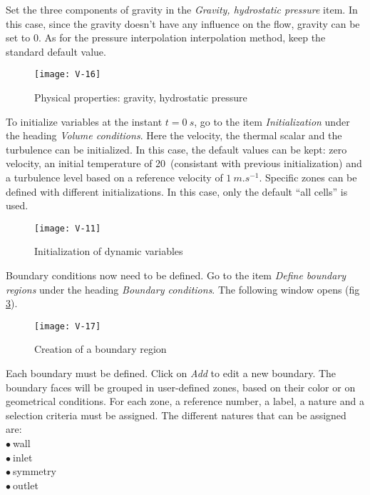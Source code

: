 \clearpage
Set the three components of gravity in the
{\itshape Gravity, hydrostatic pressure} item.
In this case, since the gravity doesn't have
any influence on the flow, gravity can be set to 0.
As for the pressure interpolation interpolation method, keep the standard
default value.

\begin{figure}[ht]
\begin{center}
\texttt{[image: V-16]}
\caption{Physical properties: gravity, hydrostatic pressure}
\label{fig19_e1}
\end{center}
\end{figure}

\clearpage
To initialize variables at the instant $t=0\ s$, go to the item {\itshape Initialization} under the heading {\itshape Volume conditions}.
Here the velocity, the thermal scalar and the turbulence can be initialized. In
this case, the default values can be kept: zero velocity, an initial temperature
of 20\degresC\ (consistant with previous initialization) and a turbulence level based on a reference velocity of $1\
m.s^{-1}$. Specific zones can be defined with different initializations. In this
case, only the default ``all cells'' is used.

\begin{figure}[ht]
\begin{center}
\texttt{[image: V-11]}
\caption{Initialization of dynamic variables}
\label{fig14_e1}
\end{center}
\end{figure}



\clearpage
Boundary conditions now need to be defined. Go to the item {\itshape Define
boundary regions} under the heading {\itshape Boundary conditions}.
The following window opens (fig \ref{fig20_e1}).

\begin{figure}[ht]
\begin{center}
\texttt{[image: V-17]}
\caption{Creation of a boundary region}
\label{fig20_e1}
\end{center}
\end{figure}


\clearpage
Each boundary must be defined. Click on {\itshape Add} to edit a new boundary. 
The boundary faces will be grouped in
user-defined zones, based on their color or on geometrical conditions. For each
zone, a reference number, a label, a nature and a selection criteria must be
assigned.
The different natures that can be assigned are:\\
\hspace*{1cm}$\bullet\ $wall\\
\hspace*{1cm}$\bullet\ $inlet\\
\hspace*{1cm}$\bullet\ $symmetry\\
\hspace*{1cm}$\bullet\ $outlet

